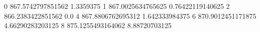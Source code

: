 0 867.5742797851562 1.3359375
1 867.0025634765625 0.76422119140625
2 866.2383422851562 0.0
4 867.8806762695312 1.642333984375
6 870.9012451171875 4.66290283203125
8 875.1255493164062 8.88720703125
